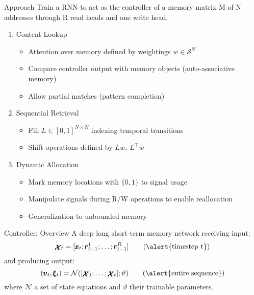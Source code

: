 \documentclass{beamer}
\newcommand{\xx}{\pmb{\raisebox{-1.5pt}{$\mathcal{X}$}}}
\begin{document}
\begin{frame}{Approach}
	Train a RNN to act as the \alert{controller} of a memory matrix M of N 
	addresses through R \alert{read heads} and one \alert{write head}.
	
	\pause
	\begin{enumerate}
	\item \alert{Content Lookup}\\
		\begin{itemize}
		\item \alert{Attention} over memory defined by weightings $w \in \mathcal{S}^N$
		\item Compare controller output with memory objects (\alert{auto-associative memory})
		\item Allow partial matches  (\alert{pattern completion})
		\end{itemize}
	\pause
	\item \alert{Sequential Retrieval}
		\begin{itemize} 
		\item Fill $L \in [0,1]^{N \times N}$ indexing \alert{temporal transitions}
		\item \alert{Shift} operations defined by $Lw,\ L^\top w$
		\end{itemize}
	\pause
	\item \alert{Dynamic Allocation}
		\begin{itemize}
		\item Mark memory locations with $\{0,1\}$ to \alert{signal usage}
		\item Manipulate signals during R/W operations to enable \alert{reallocation}
		\item Generalization to \alert{unbounded memory}
		\end{itemize}
	\end{enumerate}
\end{frame}
	
\begin{frame}{Controller: Overview}
	A deep \alert{long short-term memory network} receiving input:
	\[
	\xx_t=[ \pmb{x}_t; \pmb{r}_{t-1}^1; \dots ;\pmb{r}_{t-1}^R] \tag{\text{\alert{timestep t}}}
	\]
	and producing output:
	\[
	(\pmb{\upsilon}_t,\pmb{\xi}_t)=\mathcal{N}([\xx_1;\dots;\xx_t];\vartheta) \tag{\text{\alert{entire sequence}}}
	\]
	where \alert{$\mathcal{N}$} a set of state equations and \alert{$\vartheta$} their trainable parameters.
\end{frame}
\end{document}
